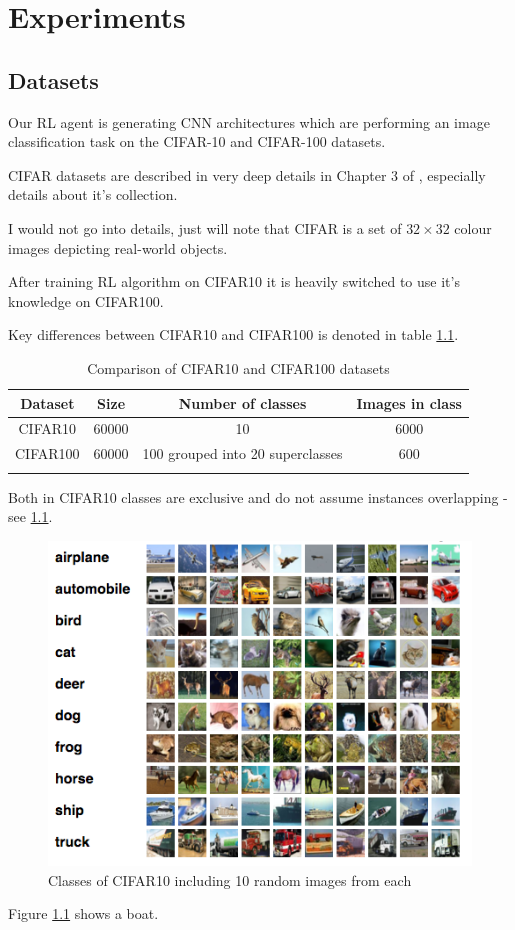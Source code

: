 \chapter{Experiments}

\section{Datasets}

Our RL agent is generating CNN architectures which are performing an image classification task on the CIFAR-10 and CIFAR-100 datasets.

CIFAR datasets are described in very deep details in Chapter 3 of \cite{CIFAR}, especially details about it's collection.

I would not go into details, just will note that CIFAR is a set of $32\times 32$ colour images depicting real-world objects.

After training RL algorithm on CIFAR10 it is heavily switched to use it's knowledge on CIFAR100.

Key differences between CIFAR10 and CIFAR100 is denoted in table \ref{table:1}.

\begin{table}[h!]
\centering
\begin{tabular}{c c c c} 
 \hline
 Dataset & Size & Number of classes & Images in class \\ [0.5ex] 
 \hline
 CIFAR10 & 60000 & 10 & 6000 \\
 \hline
 CIFAR100 & 60000 & 100 grouped into 20 superclasses & 600 \\
 \hline \\ [0.5ex]
\end{tabular}
\caption{Comparison of CIFAR10 and CIFAR100 datasets}
\label{table:1}
\end{table}

Both in CIFAR10 classes are exclusive and do not assume instances overlapping - see \ref{fig:cifar10}. 

\begin{figure}[!htb]
  \includegraphics[width=\linewidth]{images/cifar10example.png}
  \caption{Classes of CIFAR10 including 10 random images from each \cite{CIFAR}}
  \label{fig:cifar10}
\end{figure}
Figure \ref{fig:cifar10} shows a boat.

